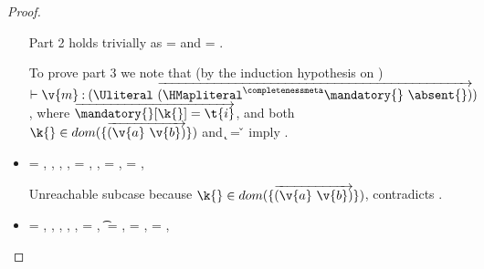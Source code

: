 \begin{lemma}
\begin{proof}
\begin{case}[B-Get]
\begin{itemize}
\begin{subcase}[T-GetHMap]
         Part 2 holds trivially as \thenprop{\prop{}} = {\topprop{}}
         and \elseprop{\prop{}} = {\topprop{}}.

         To prove part 3 we note that (by the induction hypothesis on )
         $\judgementtwo{}{\v{m}}{\Unionsplice{\overrightarrow {\HMapgeneric {\mandatory{}} {\absent{}}}}}$,
         where $\overrightarrow{\inmandatory{\k{}}{\t{i}}{\mandatory{}}}$, and 
         both
         $\keyinmap{\k{}}{\curlymap{\overrightarrow{({\v{a}}\ {\v{b}})}}}$
         and
          {\k{}} = {\v{}}
         imply .

      \end{subcase}
    \item[]
      \begin{subcase}[T-GetHMapAbsent]
  \ep{} = { {}},
  \judgementtworewrite {\propenv{}} {} {} {},
  \judgementrewrite {\propenv{}} {} {\HMapgeneric {\mandatory{}} {\absent}}
           { {}}
           {}
           {},
  {\inabsent{\k{}}{\absent{}}},
  \e{} = { {}},
  \issubtypein{}{\Nil}{\t{}},
  \thenprop{\prop{}} = {\topprop{}},
  \elseprop{\prop{}} = {\topprop{}},
                        {\object{}}

       Unreachable subcase because 
         $\keyinmap{\k{}}{\curlymap{\overrightarrow{({\v{a}}\ {\v{b}})}}}$,
         contradicts
                {\inabsent{\k{}}{\absent{}}}.
      \end{subcase}
    \item[]
      \begin{subcase}[T-GetHMapPartialDefault]
  \ep{} = { {}},
  \judgementtworewrite {\propenv{}} {} {}{},
 \judgementrewrite {\propenv{}} {} {\HMapp {\mandatory{}} {\absent}}
           { {}}
           {}
           {},
             {\notinmandatory{\k{}}{\t{}}{\mandatory{}}},
             {\notinabsent{\k{}}{\absent{}}},
  \e{} = { {}},
  \t{} = \Top,
  \thenprop{\prop{}} = {\topprop{}},
  \elseprop{\prop{}} = {\topprop{}},


\end{subcase}
\end{itemize}
\end{case}
\end{proof}
\end{lemma}
